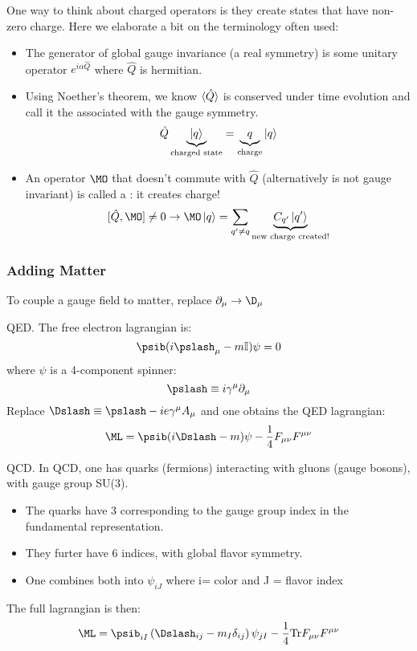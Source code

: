 \documentclass[11pt]{scrartcl}
\begin{document}
One way to think about charged operators is they create states that have non-zero charge.  Here we elaborate a bit on the terminology often used:
\begin{itemize}
	\item The generator of global gauge invariance (a real symmetry) is some unitary operator  $e^{i \alpha \hat{Q}}$ where $\hat{Q}$ is hermitian.
	\item Using Noether's theorem, we know $\braket{\hat{Q}}$ is conserved under time evolution and call it the  associated with the gauge symmetry.
	\[ \hat{Q} \underbrace{\ket{q}}_{\text{charged state}} = \underbrace{q}_{\text{charge}} \ket{q}\]
	\item An operator $\MO$ that doesn't commute with $\hat{Q}$ (alternatively is not gauge invariant) is called a : it creates charge! 
	\[ [\hat{Q}, \MO] \neq 0 \rightarrow \MO \ket{q} = \sum_{q' \neq q} \underbrace{C_{q'} \ket{q'}}_{\text{new charge created!}} \]
\end{itemize}

\subsubsection{Adding Matter}
To couple a gauge field to matter, replace $\partial_\mu \rightarrow \D_\mu$
\begin{example}
	QED.
	The free electron lagrangian is:
	\[ \psib (i \pslash_\mu - m \mathbb{I}) \psi = 0\]
	where $\psi$ is a 4-component spinner:
	\[ \pslash \equiv i \gamma^\mu \partial_\mu \]
	Replace $\Dslash \equiv \pslash - i e \gamma^\mu A_\mu$ 
	and one obtains the QED lagrangian:
	\[ \ML = \psib (i \Dslash - m) \psi - \frac14 F_{\mu \nu} F^{\mu \nu} \]
	\end{example}

\begin{example}
	QCD.  In QCD, one has quarks (fermions) interacting with gluons (gauge bosons), with gauge group SU(3).
	\begin{itemize}
		\item The quarks have 3  corresponding to the gauge group index in the fundamental representation.
		\item They furter have 6  indices, with global flavor symmetry.
		\item One combines both into $\psi_{i J}$ where i= color and J = flavor index
		\end{itemize}
	The full lagrangian is then:
	\[ \ML = \psib_{iI} \left( \Dslash_{ij} - m_I \delta_{ij} \right) \psi_{jI}  - \frac14 \mathrm{Tr} F_{\mu \nu} F^{\mu \nu}  \]
	\end{example}
\end{document}
